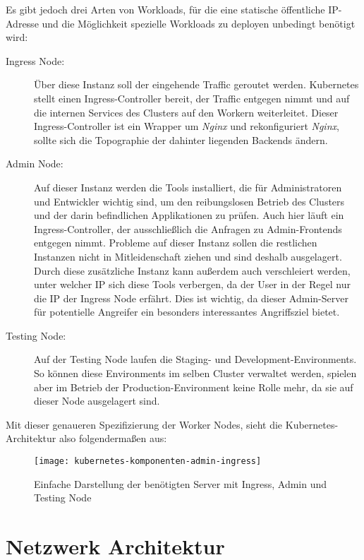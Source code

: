 Es gibt jedoch drei Arten von Workloads, für die eine statische \"offentliche IP-Adresse
und die Möglichkeit spezielle Workloads zu deployen unbedingt benötigt wird:
\begin{description}
  \item[Ingress Node:] Über diese Instanz soll der eingehende Traffic
  geroutet werden.
  Kubernetes stellt einen Ingress-Controller bereit, der Traffic entgegen
  nimmt und auf die internen
  Services des Clusters auf den Workern weiterleitet. Dieser
  Ingress-Controller
  ist ein Wrapper um \emph{Nginx} und rekonfiguriert \emph{Nginx}, sollte sich
  die Topographie der dahinter liegenden Backends ändern.
  \item[Admin Node:] Auf dieser Instanz werden die Tools installiert, die für
  Administratoren und Entwickler wichtig sind, um den reibungslosen Betrieb des
  Clusters und der darin befindlichen Applikationen zu prüfen.
  Auch hier läuft ein Ingress-Controller, der ausschließlich die Anfragen
  zu Admin-Frontends entgegen nimmt.
  Probleme auf dieser Instanz sollen die restlichen Instanzen nicht in
  Mitleidenschaft ziehen und sind deshalb ausgelagert.
  Durch diese zusätzliche Instanz kann außerdem auch verschleiert werden,
  unter welcher IP sich diese Tools verbergen, da der User in der Regel nur
  die IP der Ingress Node erfährt.
  Dies ist wichtig, da dieser Admin-Server für
  potentielle Angreifer ein besonders interessantes Angriffsziel bietet.
  \item[Testing Node:] Auf der Testing Node laufen die Staging- und
  Development-Environments. So können diese Environments im selben Cluster verwaltet werden,
  spielen aber im Betrieb der Production-Environment keine Rolle mehr, da sie
  auf dieser Node ausgelagert sind.
\end{description}

Mit dieser genaueren Spezifizierung der Worker Nodes,
sieht die Kubernetes-Architektur also folgendermaßen aus:
\begin{figure}[H]
\centering
\texttt{[image: kubernetes-komponenten-admin-ingress]}
\caption{Einfache Darstellung der benötigten Server mit Ingress, Admin und Testing Node}
\end{figure}

\section{Netzwerk Architektur}

